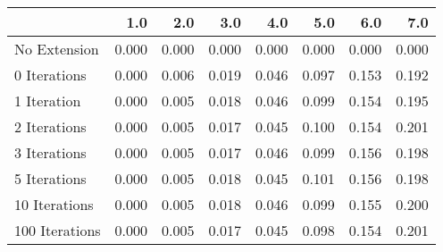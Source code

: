 \begin{tabular}{lrrrrrrr}
\toprule
{} &   1.0 &   2.0 &   3.0 &   4.0 &   5.0 &   6.0 &   7.0 \\
\midrule
No Extension   & 0.000 & 0.000 & 0.000 & 0.000 & 0.000 & 0.000 & 0.000 \\
0 Iterations   & 0.000 & 0.006 & 0.019 & 0.046 & 0.097 & 0.153 & 0.192 \\
1 Iteration    & 0.000 & 0.005 & 0.018 & 0.046 & 0.099 & 0.154 & 0.195 \\
2 Iterations   & 0.000 & 0.005 & 0.017 & 0.045 & 0.100 & 0.154 & 0.201 \\
3 Iterations   & 0.000 & 0.005 & 0.017 & 0.046 & 0.099 & 0.156 & 0.198 \\
5 Iterations   & 0.000 & 0.005 & 0.018 & 0.045 & 0.101 & 0.156 & 0.198 \\
10 Iterations  & 0.000 & 0.005 & 0.018 & 0.046 & 0.099 & 0.155 & 0.200 \\
100 Iterations & 0.000 & 0.005 & 0.017 & 0.045 & 0.098 & 0.154 & 0.201 \\
\bottomrule
\end{tabular}

